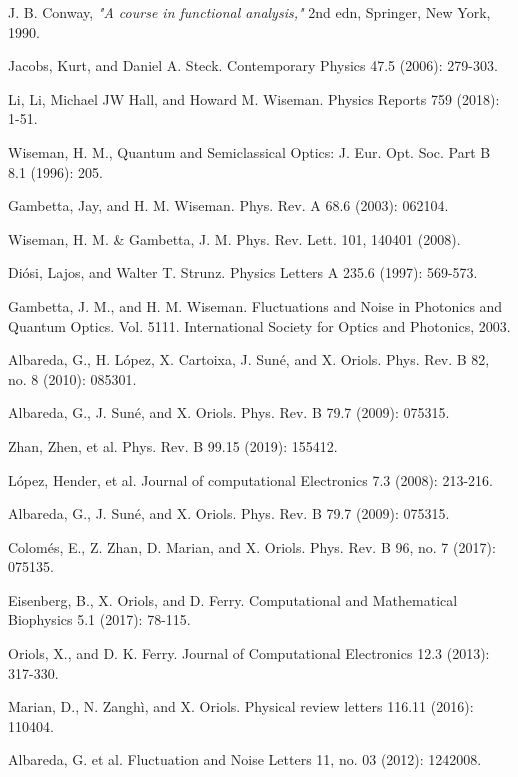 \documentclass[11pt, a4paper]{article} %
\begin{document}
\begin{thebibliography}{1}
{
J. B. Conway, {\em "A course in functional analysis,"} 2nd edn, Springer, New York, 1990.

Jacobs, Kurt, and Daniel A. Steck. Contemporary Physics 47.5 (2006): 279-303.

Li, Li, Michael JW Hall, and Howard M. Wiseman. Physics Reports 759 (2018): 1-51.

Wiseman, H. M., Quantum and Semiclassical Optics: J. Eur. Opt. Soc. Part B 8.1 (1996): 205.

Gambetta, Jay, and H. M. Wiseman. Phys. Rev. A 68.6 (2003): 062104.

Wiseman, H. M. \& Gambetta, J. M. Phys. Rev. Lett. 101, 140401 (2008).

Diósi, Lajos, and Walter T. Strunz. Physics Letters A 235.6 (1997): 569-573.

Gambetta, J. M., and H. M. Wiseman. Fluctuations and Noise in Photonics and Quantum Optics. Vol. 5111. International Society for Optics and Photonics, 2003.

Albareda, G., H. López, X. Cartoixa, J. Suné, and X. Oriols. Phys. Rev. B 82, no. 8 (2010): 085301.

Albareda, G., J. Suné, and X. Oriols. Phys. Rev. B 79.7 (2009): 075315.

Zhan, Zhen, et al. Phys. Rev. B 99.15 (2019): 155412.

López, Hender, et al. Journal of computational Electronics 7.3 (2008): 213-216.

Albareda, G., J. Suné, and X. Oriols. Phys. Rev. B 79.7 (2009): 075315.

Colomés, E., Z. Zhan, D. Marian, and X. Oriols. Phys. Rev. B 96, no. 7 (2017): 075135.

Eisenberg, B., X. Oriols, and D. Ferry. Computational and Mathematical Biophysics 5.1 (2017): 78-115.

Oriols, X., and D. K. Ferry. Journal of Computational Electronics 12.3 (2013): 317-330.

Marian, D., N. Zanghì, and X. Oriols. Physical review letters 116.11 (2016): 110404.

Albareda, G. et al. Fluctuation and Noise Letters 11, no. 03 (2012): 1242008.

}
\end{thebibliography}
\end{document}
